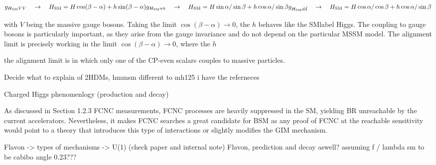 \begin{equation}
    g_{H_\text{SM}VV}\quad \rightarrow\quad H_\text{SM} = H \cos(\beta-\alpha)+h\sin(\beta-\alpha)\\
    g_{H_\text{SM}u\bar{u}}\quad \rightarrow\quad H_\text{SM} = H \sin\alpha/\sin\beta+h\cos\alpha/\sin\beta\\
    g_{H_\text{SM}d\bar{d}}\quad \rightarrow\quad H_\text{SM} = H \cos\alpha/\cos\beta+h\cos\alpha/\sin\beta\\
    
\end{equation}

with $V$ being the massive gauge bosons. Taking the limit $\cos(\beta-\alpha)\to 0$, the $h$ behaves like the \acrshort{SMlabel} Higgs. The coupling to gauge bosons is particularly important, as they arise from the gauge invariance and do not depend on the particular MSSM model. 
The alignment limit is precisely working in the limit $\cos(\beta-\alpha)\to 0$, where the $h$

the alignment limit is in which only one of the CP-even scalars couples to massive particles. %





Decide what to explain of 2HDMs, hmmsm different to mh125 i have the referneces

Charged Higgs phenomenlogy (production and decay)

As discussed in Section 1.2.3 FCNC measurements, FCNC processes are heavily suppressed in the SM, yielding BR unreachable by the current accelerators. Nevertheless, it makes FCNC searches a great candidate for BSM as any proof of FCNC at the reachable sensitivity would point to a theory that introduces this type of interactions or slightly modifies the GIM mechanism.

Flavon -> types of mechanisms -> U(1) (check paper and internal note)
Flavon, prediction and decay aswell?
assuming f / lambda sm to be cabibo angle 0.23???


